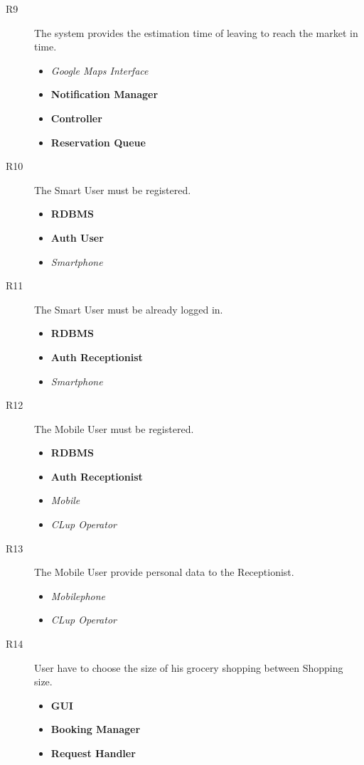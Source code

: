 \begin{description}
\item[R9] The system provides the estimation time of leaving to reach the market in time.
    \begin{itemize}
        \item \textit{Google Maps Interface}
        \item \textbf{Notification Manager}
        \item \textbf{Controller}
        \item \textbf{Reservation Queue}
    \end{itemize}


\item[R10] The Smart User must be registered.
    \begin{itemize}
        \item \textbf{RDBMS}
        \item \textbf{Auth User}
        \item \textit{Smartphone}
    \end{itemize}



\item[R11] The Smart User must be already logged in.
    \begin{itemize}
        \item \textbf{RDBMS}
        \item \textbf{Auth Receptionist}
        \item \textit{Smartphone}
    \end{itemize}


\item[R12] The Mobile User must be registered. %
    \begin{itemize}
        \item \textbf{RDBMS}
        \item \textbf{Auth Receptionist}
        \item \textit{Mobile}
        \item \textit{CLup Operator}
    \end{itemize}

\item[R13] The Mobile User provide personal data to the Receptionist. %
\begin{itemize}
        \item \textit{Mobilephone}
        \item \textit{CLup Operator}
  \end{itemize}

\item[R14] User have to choose the size of his grocery shopping between Shopping size.
    \begin{itemize}
        \item \textbf{GUI}
        \item \textbf{Booking Manager}
        \item \textbf{Request Handler}
    \end{itemize}



\end{description}

